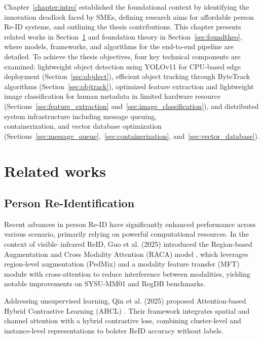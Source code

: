 \documentclass[../main.tex]{subfiles}
\begin{document}
Chapter~\ref{chapter:intro} established the foundational context by identifying the innovation deadlock faced by SMEs, defining research aims for affordable person Re-ID systems, and outlining the thesis contributions. This chapter presents related works in Section~\ref{sec:related} and foundation theory in Section~\ref{sec:foundtheo}, where models, frameworks, and algorithms for the end-to-end pipeline are detailed. To achieve the thesis objectives, four key technical components are examined: lightweight object detection using YOLOv11 for CPU-based edge deployment (Section~\ref{sec:objdect}), efficient object tracking through ByteTrack algorithms (Section~\ref{sec:objtrack}), optimized feature extraction and lightweight image classification for human metadata in limited hardware resource (Sections~\ref{sec:feature_extraction} and~\ref{sec:image_classification}), and distributed system infrastructure including message queuing,\\ containerization, and vector database optimization (Sections~\ref{sec:message_queue},~\ref{sec:containerization}, and~\ref{sec:vector_database}).

\section{Related works}
\label{sec:related}

\subsection{Person Re-Identification}
\label{sec:personreid}

Recent advances in person Re-ID have significantly enhanced performance across various scenario, primarily relying on powerful computational resources. In the context of visible–infrared ReID, Guo et al. (2025) introduced the Region‑based Augmentation and Cross Modality Attention (RACA) model \cite{visible-infrared-reid}, which leverages region-level augmentation (PedMix) and a modality feature transfer (MFT) module with cross-attention to reduce interference between modalities, yielding notable improvements on SYSU‑MM01 and RegDB benchmarks.

Addressing unsupervised learning, Qin et al. (2025) proposed Attention‑based Hybrid Contrastive Learning (AHCL) \cite{unsupervised-reid}. Their framework integrates spatial and channel attention with a hybrid contrastive loss, combining cluster-level and instance-level representations to bolster ReID accuracy without labels.
 
\end{document}
